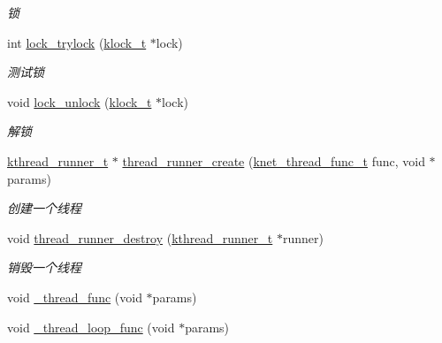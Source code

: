\begin{DoxyCompactItemize}
\begin{DoxyCompactList}\small\item\em 锁 \end{DoxyCompactList}\item 
int \hyperlink{a00099_a878c20be611d9e051d0e9621546f15a2_a878c20be611d9e051d0e9621546f15a2}{lock\+\_\+trylock} (\hyperlink{a00066_a4c2f62ab63ab1fd49c71e52bbda0f393_a4c2f62ab63ab1fd49c71e52bbda0f393}{klock\+\_\+t} $\ast$lock)
\begin{DoxyCompactList}\small\item\em 测试锁 \end{DoxyCompactList}\item 
void \hyperlink{a00099_ae6d02ffedf7b881d70601d1ee73c3d72_ae6d02ffedf7b881d70601d1ee73c3d72}{lock\+\_\+unlock} (\hyperlink{a00066_a4c2f62ab63ab1fd49c71e52bbda0f393_a4c2f62ab63ab1fd49c71e52bbda0f393}{klock\+\_\+t} $\ast$lock)
\begin{DoxyCompactList}\small\item\em 解锁 \end{DoxyCompactList}\item 
\hyperlink{a00066_a4f78c259c9527c821f1a6f87495dd339_a4f78c259c9527c821f1a6f87495dd339}{kthread\+\_\+runner\+\_\+t} $\ast$ \hyperlink{a00138_gacc8838f250e5f685580a508e93d3f636_gacc8838f250e5f685580a508e93d3f636}{thread\+\_\+runner\+\_\+create} (\hyperlink{a00066_a8741dac4a9f8d97603eb3a30a3473b13_a8741dac4a9f8d97603eb3a30a3473b13}{knet\+\_\+thread\+\_\+func\+\_\+t} func, void $\ast$params)
\begin{DoxyCompactList}\small\item\em 创建一个线程 \end{DoxyCompactList}\item 
void \hyperlink{a00138_gaa9112d70f3e5a8dcf648ce531332f66a_gaa9112d70f3e5a8dcf648ce531332f66a}{thread\+\_\+runner\+\_\+destroy} (\hyperlink{a00066_a4f78c259c9527c821f1a6f87495dd339_a4f78c259c9527c821f1a6f87495dd339}{kthread\+\_\+runner\+\_\+t} $\ast$runner)
\begin{DoxyCompactList}\small\item\em 销毁一个线程 \end{DoxyCompactList}\item 
void \hyperlink{a00099_ae1217c770962ea59a20fa931ad6fee0c_ae1217c770962ea59a20fa931ad6fee0c}{\+\_\+thread\+\_\+func} (void $\ast$params)
\item 
void \hyperlink{a00099_ad2578ccaa4c6ce7670eabd9575204c38_ad2578ccaa4c6ce7670eabd9575204c38}{\+\_\+thread\+\_\+loop\+\_\+func} (void $\ast$params)
\item 

\end{DoxyCompactItemize}
